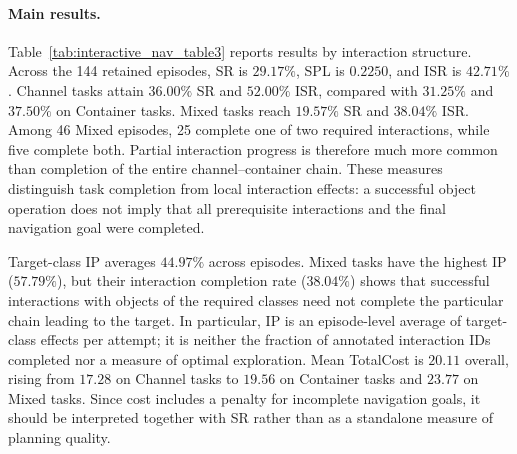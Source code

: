 \paragraph{Main results.}
Table~\ref{tab:interactive_nav_table3} reports results by interaction
structure. Across the 144 retained episodes, SR is $29.17\%$, SPL is
$0.2250$, and ISR is $42.71\%$. Channel tasks attain $36.00\%$ SR and
$52.00\%$ ISR, compared with $31.25\%$ and $37.50\%$ on Container tasks.
Mixed tasks reach $19.57\%$ SR and $38.04\%$ ISR. Among 46 Mixed episodes,
25 complete one of two required interactions, while five complete both.
Partial interaction progress is therefore much more common than completion
of the entire channel--container chain. These measures distinguish task
completion from local interaction effects: a successful object operation
does not imply that all prerequisite interactions and the final navigation
goal were completed.

Target-class IP averages $44.97\%$ across episodes. Mixed tasks have the
highest IP ($57.79\%$), but their interaction completion rate ($38.04\%$)
shows that successful interactions with objects of the required classes
need not complete the particular chain leading to the target. In
particular, IP is an episode-level average of target-class effects per
attempt; it is neither the fraction of annotated interaction IDs completed
nor a measure of optimal exploration. Mean TotalCost is $20.11$ overall,
rising from $17.28$ on Channel tasks to $19.56$ on Container tasks and
$23.77$ on Mixed tasks. Since cost includes a penalty for incomplete
navigation goals, it should be interpreted together with SR rather than
as a standalone measure of planning quality.

